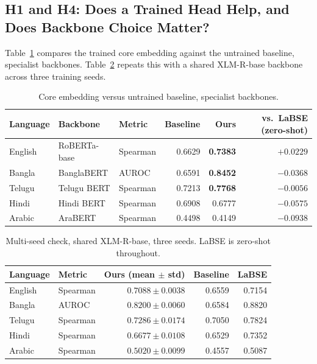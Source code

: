 \documentclass[manuscript]{acmart}
\begin{document}
\subsection{H1 and H4: Does a Trained Head Help, and Does Backbone Choice Matter?}

Table~\ref{tab:specialist} compares the trained core embedding against the untrained baseline, specialist backbones. Table~\ref{tab:multiseed} repeats this with a shared XLM-R-base backbone across three training seeds.

\begin{table}[h]
\caption{Core embedding versus untrained baseline, specialist backbones.}
\label{tab:specialist}
\begin{tabular}{@{}lllrrr@{}}
\toprule
Language & Backbone & Metric & Baseline & Ours & vs.\ LaBSE (zero-shot) \\
\midrule
English & RoBERTa-base   & Spearman & 0.6629 & \textbf{0.7383} & $+0.0229$ \\
Bangla  & BanglaBERT     & AUROC    & 0.6591 & \textbf{0.8452} & $-0.0368$ \\
Telugu  & Telugu BERT    & Spearman & 0.7213 & \textbf{0.7768} & $-0.0056$ \\
Hindi   & Hindi BERT     & Spearman & 0.6908 & 0.6777           & $-0.0575$ \\
Arabic  & AraBERT        & Spearman & 0.4498 & 0.4149           & $-0.0938$ \\
\bottomrule
\end{tabular}
\end{table}

\begin{table}[h]
\caption{Multi-seed check, shared XLM-R-base, three seeds. LaBSE is zero-shot throughout.}
\label{tab:multiseed}
\begin{tabular}{@{}llrrr@{}}
\toprule
Language & Metric & Ours (mean $\pm$ std) & Baseline & LaBSE \\
\midrule
English & Spearman & $0.7088 \pm 0.0038$ & 0.6559 & 0.7154 \\
Bangla  & AUROC    & $0.8200 \pm 0.0060$ & 0.6584 & 0.8820 \\
Telugu  & Spearman & $0.7286 \pm 0.0174$ & 0.7050 & 0.7824 \\
Hindi   & Spearman & $0.6677 \pm 0.0108$ & 0.6529 & 0.7352 \\
Arabic  & Spearman & $0.5020 \pm 0.0099$ & 0.4557 & 0.5087 \\
\bottomrule
\end{tabular}
\end{table}
\end{document}
